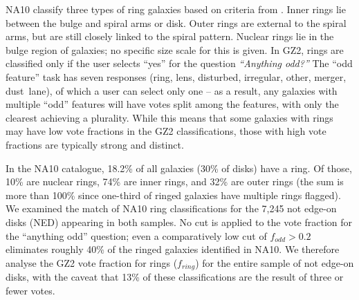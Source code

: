 \documentclass[useAMS,usenatbib]{mn2e}
\begin{document}
NA10 classify three types of ring galaxies based on criteria from \citet{but96}. Inner rings lie between the bulge and spiral arms or disk. Outer rings are external to the spiral arms, but are still closely linked to the spiral pattern. Nuclear rings lie in the bulge region of galaxies; no specific size scale for this is given. In GZ2, rings are classified only if the user selects ``yes'' for the question {\it ``Anything odd?''} The ``odd feature'' task has seven responses (ring, lens, disturbed, irregular, other, merger, dust~lane), of which a user can select only one -- as a result, any galaxies with multiple ``odd'' features will have votes split among the features, with only the clearest achieving a plurality. While this means that some galaxies with rings may have low vote fractions in the GZ2 classifications, those with high vote fractions are typically strong and distinct.

In the NA10 catalogue, 18.2\% of all galaxies (30\% of disks) have a ring. Of those, 10\% are nuclear rings, 74\% are inner rings, and 32\% are outer rings (the sum is more than 100\% since one-third of ringed galaxies have multiple rings flagged). We examined the match of NA10 ring classifications for the 7,245 not edge-on disks (NED) appearing in both samples. No cut is applied to the vote fraction for the ``anything odd'' question; even a comparatively low cut of $f_{odd}>0.2$ eliminates roughly 40\% of the ringed galaxies identified in NA10. We therefore analyse the GZ2 vote fraction for rings ($f_{ring}$) for the entire sample of not edge-on disks, with the caveat that 13\% of these classifications are the result of three or fewer votes.
\end{document}
